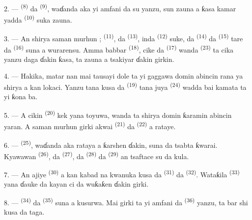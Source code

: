 2. ---  \textsuperscript{(8)} da  \textsuperscript{(9)}, waɗanda aka yi amfani da su yanzu, sun
zauna a ƙasa kamar yadda  \textsuperscript{(10)} suka
zauna.

3. --- An shirya saman murhun ; 
\textsuperscript{(11)}, da 
\textsuperscript{(13)}, inda  \textsuperscript{(12)} suke,
da  \textsuperscript{(14)} da  \textsuperscript{(15)} tare da 
\textsuperscript{(16)} suna a wurarensu. Amma babbar  \textsuperscript{(18)}, cike da 
\textsuperscript{(17)} wanda  \textsuperscript{(23)} ta
cika yanzu daga ɗakin ƙasa, ta zauna a tsakiyar ɗakin girkin.

4. --- Hakika, matar nan mai tausayi dole ta yi gaggawa domin abincin
rana ya shirya a kan lokaci. Yanzu tana kusa da 
\textsuperscript{(19)} tana juya  \textsuperscript{(24)}
wadda bai kamata ta yi ƙona ba.

5. --- A cikin  \textsuperscript{(20)} kek yana toyuwa,
wanda ta shirya domin ƙaramin abincin yaran. A saman murhun girki
akwai  \textsuperscript{(21)} da 
\textsuperscript{(22)} a rataye.

\VUsaut{4.0mm}
\VUsaut{3.0mm}

6. ---  \textsuperscript{(25)}, waɗanda aka rataya
a ƙarshen ɗakin, suna da tsabta ƙwarai. Kyawawan  \textsuperscript{(26)}, da 
\textsuperscript{(27)}, da  \textsuperscript{(28)} da
 \textsuperscript{(29)} an tsaftace su da kula.

7. --- An ajiye  \textsuperscript{(30)} a kan
kabad na kwanuka kusa da  \textsuperscript{(31)}
da  \textsuperscript{(32)}. Wataƙila
 \textsuperscript{(33)} yana ɗauke da kayan ci da
wuƙaƙen ɗakin girki.

8. ---  \textsuperscript{(34)} da  \textsuperscript{(35)} suna a kusurwa. Mai girki ta yi
amfani da  \textsuperscript{(36)} yanzu, ta bar
shi kusa da taga.

